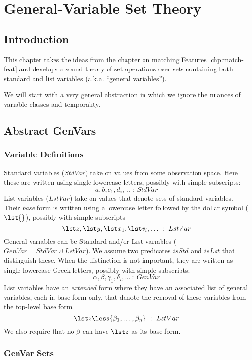 \chapter{General-Variable Set Theory}\label{chp:genvar-set-theory}

\section{Introduction}

This chapter takes the ideas from the chapter on matching Features
\ref{chp:match-feat}
and develops a sound theory of set operations over sets containing
both standard and list variables (a.k.a. ``general variables'').

We will start with a very general abstraction in which we ignore the
nuances of variable classes and temporality.

\section{Abstract GenVars}

\subsection{Variable Definitions}

Standard variables ($StdVar$) take on values from some observation space.
Here these are written using single lowercase letters, 
possibly with simple subscripts:
%
$$a,b,c_1,d_i,\dots  ~:~  StdVar$$
%
List variables ($LstVar$) take on values that denote sets of standard variables.
Their \emph{base} form is written 
using a lowercase letter followed by the dollar symbol ($\lst{}$),
possibly with simple subscripts:
%
$$\lst z,\lst y,\lst x_1,\lst v_i,\dots ~:~ LstVar$$
%
General variables can be Standard and/or List variables
($GenVar = StdVar \uplus LstVar$).
We assume two predicates $isStd$ and $isLst$ that distinguish these.
When the distinction is not important,
they are written as single lowercase Greek letters, 
possibly with simple subscripts:
%
$$\alpha,\beta,\gamma_1,\delta_i,\dots ~:~ GenVar$$
%
List variables have an \emph{extended} form where they have an associated list
of general variables, each in base form only,
that denote the removal of these variables from the top-level base form.
%
$$\lst z\less{\beta_1,\dots,\beta_n} ~:~ LstVar$$
%
We also require that no $\beta$ can have $\lst z$ as its base form.

\subsection{GenVar Sets}

